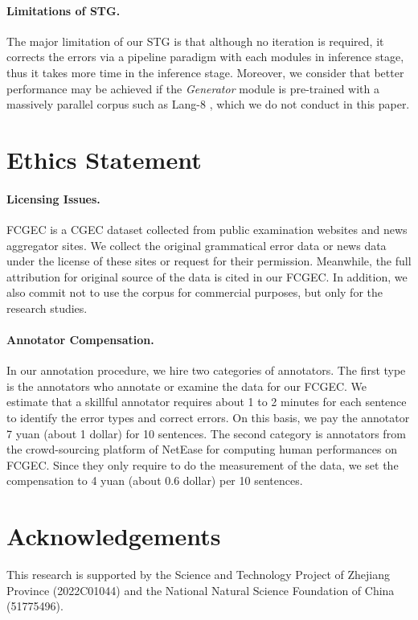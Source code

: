 \documentclass[11pt]{article}
\begin{document}
\paragraph{Limitations of STG.} The major limitation of our STG is that although no iteration is required, it corrects the errors via a pipeline paradigm with each modules in inference stage, thus it takes more time in the inference stage. Moreover, we consider that better performance may be achieved if the \emph{Generator} module is pre-trained with a massively parallel corpus such as Lang-8 \cite{zhao2018overview}, which we do not conduct in this paper. 
\section*{Ethics Statement}

\paragraph{Licensing Issues.} FCGEC is a CGEC dataset collected from public examination websites and news aggregator sites. We collect the original grammatical error data or news data under the license of these sites or request for their permission. Meanwhile, the full attribution for original source of the data is cited in our FCGEC. In addition, we also commit not to use the corpus for commercial purposes, but only for the research studies.

\paragraph{Annotator Compensation.} In our annotation procedure, we hire two categories of annotators. The first type is the annotators who annotate or examine the data for our FCGEC. We estimate that a skillful annotator requires about 1 to 2 minutes for each sentence to identify the error types and correct errors. On this basis, we pay the annotator 7 yuan (about 1 dollar) for 10 sentences. The second category is annotators from the crowd-sourcing platform of NetEase for computing human performances on FCGEC. Since they only require to do the measurement of the data, we set the compensation to 4 yuan (about 0.6 dollar) per 10 sentences. 
\section*{Acknowledgements}
This research is supported by the Science and Technology Project of Zhejiang Province (2022C01044) and the National Natural Science Foundation of China (51775496). 


\end{document}
